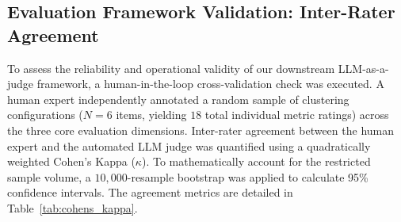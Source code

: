 \subsection{Evaluation Framework Validation: Inter-Rater Agreement}
\label{subsec:inter_rater_agreement}

To assess the reliability and operational validity of our downstream LLM-as-a-judge framework, a human-in-the-loop cross-validation check was executed.
A human expert independently annotated a random sample of clustering configurations ($N = 6$ items, yielding $18$ total individual metric ratings) across the three core evaluation dimensions. 
Inter-rater agreement between the human expert and the automated LLM judge was quantified using a quadratically weighted Cohen's Kappa ($\kappa$).
To mathematically account for the restricted sample volume, a $10,000$-resample bootstrap was applied to calculate 95\% confidence intervals.
The agreement metrics are detailed in Table~\ref{tab:cohens_kappa}.

\newsavebox{\tablethreebox}

\begin{table}[t]
\centering
{}
\begin{minipage}{\wd\tablethreebox}
\centering
\setcounter{table}{2} %
\usebox{\tablethreebox}
\vspace{0.2cm}
\caption{Inter-Rater Agreement Metrics (Weighted Cohen's $\kappa$) between Human Expert and LLM Judge}
\label{tab:cohens_kappa}
\end{minipage}
\end{table}

